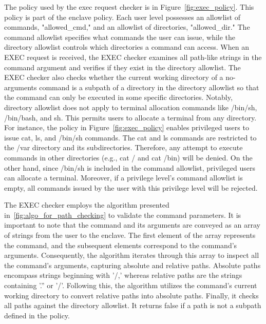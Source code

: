 The policy used by the exec request checker is in Figure~\ref{fig:exec_policy}. This policy is part of the enclave policy. Each user level possesses an allowlist of commands, "allowed\_cmd," and an allowlist of directories, "allowed\_dir." The command allowlist specifies what commands the user can issue, while the 
directory allowlist controls which directories a command can access. When an EXEC request is received, the EXEC checker examines all path-like strings in the command argument and verifies if they exist in the directory allowlist. The EXEC checker also checks whether the current working directory of 
a no-arguments command is a subpath of a directory in the directory allowlist so that the command can only be executed in some specific directories. Notably,  directory allowlist does not apply to terminal allocation commands like /bin/sh, /bin/bash, and sh. This permits users to allocate a terminal 
from any directory. For instance, the policy in Figure~\ref{fig:exec_policy} enables privileged users to issue cat, ls, and /bin/sh commands. The cat and ls commands are restricted to the /var directory and its subdirectories. Therefore, any attempt to execute commands in other directories (e.g., cat / and cat /bin) will be denied. 
On the other hand, since /bin/sh is included in the command allowlist, privileged users can allocate a terminal. Moreover, if a privilege level's command allowlist is empty, all commands issued by the user with this privilege level will be rejected.



The EXEC checker employs the algorithm presented in~\ref{fig:algo_for_path_checking} to validate the command parameters. It is important to note that the command and its arguments are conveyed as an array of strings from the user to the enclave. The first element of the array represents the command, and the subsequent elements 
correspond to the command's arguments. Consequently, the algorithm iterates through this array to inspect all the command's arguments, capturing absolute and relative paths. Absolute paths encompass strings beginning with '/,' whereas relative paths are the strings containing '.'' or '/'. Following 
this, the algorithm utilizes the command's current working directory to convert relative paths into absolute paths. Finally, it checks all paths against the directory allowlist. It returns false if a path is not a subpath defined in the policy.


